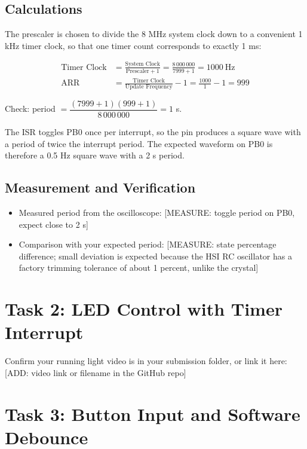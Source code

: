 \documentclass[11pt]{article}
\begin{document}
\subsection{Calculations}
The prescaler is chosen to divide the 8 MHz system clock down to a convenient 1 kHz timer clock, so that one timer count corresponds to exactly 1 ms:

\begin{align*}
    \text{Timer Clock} &= \frac{\text{System Clock}}{\text{Prescaler} + 1} = \frac{8\,000\,000}{7999 + 1} = 1000~\text{Hz} \\[2mm]
    \text{ARR} &= \frac{\text{Timer Clock}}{\text{Update Frequency}} - 1 = \frac{1000}{1} - 1 = 999
\end{align*}

Check: period $= \dfrac{(7999+1)(999+1)}{8\,000\,000} = 1$ s.

The ISR toggles PB0 once per interrupt, so the pin produces a square wave with a period of twice the interrupt period. The expected waveform on PB0 is therefore a 0.5 Hz square wave with a 2 s period.

\subsection{Measurement and Verification}
\begin{itemize}
    \item Measured period from the oscilloscope: [MEASURE: toggle period on PB0, expect close to 2 s]
    \item Comparison with your expected period: [MEASURE: state percentage difference; small deviation is expected because the HSI RC oscillator has a factory trimming tolerance of about 1 percent, unlike the crystal]
\end{itemize}

\section{Task 2: LED Control with Timer Interrupt}
Confirm your running light video is in your submission folder, or link it here: [ADD: video link or filename in the GitHub repo]

\section{Task 3: Button Input and Software Debounce}
\end{document}
